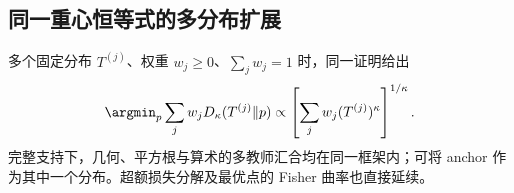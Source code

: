 \subsection{同一重心恒等式的多分布扩展}

多个固定分布 $T^{(j)}$、权重 $w_j\ge0$、$\sum_jw_j=1$ 时，同一证明给出
\begin{equation}
 \argmin_p\sum_jw_jD_\kappa(T^{(j)}\Vert p)
 \propto\left[\sum_jw_j(T^{(j)})^\kappa\right]^{1/\kappa}.
\end{equation}
完整支持下，几何、平方根与算术的多教师汇合均在同一框架内；可将 anchor 作为其中一个分布。超额损失分解及最优点的 Fisher 曲率也直接延续。

